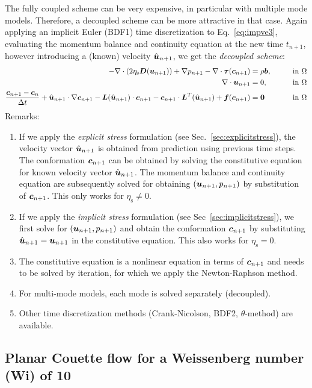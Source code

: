 The fully coupled scheme can be very expensive, in particular with multiple mode models. Therefore, a decoupled scheme can be more attractive in that case.
Again applying an implicit Euler (BDF1) time discretization to Eq.~\eqref{eq:impve3}, evaluating the momentum balance and continuity equation at the new time $t_{n+1}$, however introducing a (known) velocity $\hat{\boldsymbol{u}}_{n+1}$,
we get the \emph{decoupled scheme}:
\begin{alignat*}{2}
        -\nabla\cdot(2\eta_\text{s}\boldsymbol{D}(\boldsymbol{u}_{n+1}))+\nabla p_{n+1}-\nabla\cdot\boldsymbol{\tau}(\boldsymbol{c}_{n+1})
        &=\rho\boldsymbol{b},\qquad&&\text{in }\Omega\\
\nabla\cdot\boldsymbol{u}_{n+1}&=0,\qquad&&\text{in }\Omega\\
        \frac{\boldsymbol{c}_{n+1}-\boldsymbol{c}_n}{\Delta t}
+\hat{\boldsymbol{u}}_{n+1}\cdot\nabla\boldsymbol{c}_{n+1}-\boldsymbol{L}(\hat{\boldsymbol{u}}_{n+1})\cdot\boldsymbol{c}_{n+1}-\boldsymbol{c}_{n+1}\cdot\boldsymbol{L}^T(\hat{\boldsymbol{u}}_{n+1})
 +\boldsymbol{f}(\boldsymbol{c}_{n+1})&=\boldsymbol{0}\qquad&&\text{in }\Omega\label{eq:ddimpve3}
\end{alignat*}
Remarks:
\begin{enumerate}
\item If we apply the \emph{explicit stress} formulation (see Sec.~\ref{sec:explicitstress}), the velocity vector 
$\hat{\boldsymbol{u}}_{n+1}$ is obtained from prediction using previous time steps. The conformation $\boldsymbol{c}_{n+1}$ can be 
obtained by solving the constitutive equation for known velocity vector 
$\hat{\boldsymbol{u}}_{n+1}$.
The momentum balance and continuity equation are subsequently solved for obtaining $(\boldsymbol{u}_{n+1},p_{n+1})$ by substitution of $\boldsymbol{c}_{n+1}$. This only works for $\eta_\text{s}\neq0$.
\item If we apply the \emph{implicit stress} formulation (see Sec~\ref{sec:implicitstress}), we first solve for 
$(\boldsymbol{u}_{n+1},p_{n+1})$ and obtain the conformation $\boldsymbol{c}_{n+1}$ by substituting $\hat{\boldsymbol{u}}_{n+1}=\boldsymbol{u}_{n+1}$ in the constitutive equation. This also works for $\eta_\text{s}=0$.
\item The constitutive equation is a nonlinear equation in terms of $\boldsymbol{c}_{n+1}$ and needs to be solved by iteration, for which we apply the Newton-Raphson method.
\item For multi-mode models, each mode is solved separately (decoupled).
\item Other time discretization methods (Crank-Nicolson, BDF2, $\theta$-method) are available.
\end{enumerate}

\subsection{Planar Couette flow for a Weissenberg number (Wi) of 10}
\label{sec:couette_implicit}

